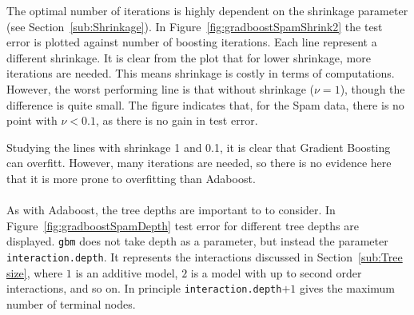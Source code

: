 The optimal number of iterations is highly dependent on the shrinkage parameter (see Section~\ref{sub:Shrinkage}). In Figure~\ref{fig:gradboostSpamShrink2} the test error is plotted against number of boosting iterations. Each line represent a different shrinkage. It is clear from the plot that for lower shrinkage, more iterations are needed. This means shrinkage is costly in terms of computations. However, the worst performing line is that without shrinkage ($\nu = 1$), though the difference is quite small. The figure indicates that, for the Spam data, there is no point with $\nu < 0.1$, as there is no gain in test error.

Studying the lines with shrinkage 1 and 0.1, it is clear that Gradient Boosting can overfitt. However, many iterations are needed, so there is no evidence here that it is more prone to overfitting than Adaboost.
\\
\\
As with Adaboost, the tree depths are important to to consider. In Figure~\ref{fig:gradboostSpamDepth} test error for different tree depths are displayed. \verb+gbm+ does not take depth as a parameter, but instead the parameter \verb+interaction.depth+. It represents the interactions discussed in Section~\ref{sub:Tree size}, where $1$ is an additive model, $2$ is a model with up to second order interactions, and so on. In principle \verb+interaction.depth+$+1$ gives the maximum number of terminal nodes.

